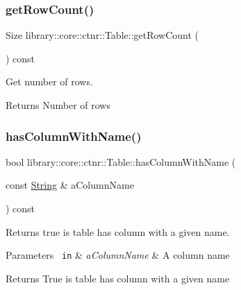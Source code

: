 \subsubsection{\texorpdfstring{getRowCount()}{getRowCount()}}
{\footnotesize\ttfamily Size library\+::core\+::ctnr\+::\+Table\+::get\+Row\+Count (\begin{DoxyParamCaption}{ }\end{DoxyParamCaption}) const}



Get number of rows. 


\begin{DoxyCode}{0}
\end{DoxyCode}


\begin{DoxyReturn}{Returns}
Number of rows 
\end{DoxyReturn}
\mbox{\label{classlibrary_1_1core_1_1ctnr_1_1_table_a53d1981ce11ba15cc920addfba23e236}} 
\subsubsection{\texorpdfstring{hasColumnWithName()}{hasColumnWithName()}}
{\footnotesize\ttfamily bool library\+::core\+::ctnr\+::\+Table\+::has\+Column\+With\+Name (\begin{DoxyParamCaption}\item[{const \mbox{\hyperlink{classlibrary_1_1core_1_1types_1_1_string}{String}} \&}]{a\+Column\+Name }\end{DoxyParamCaption}) const}



Returns true is table has column with a given name. 


\begin{DoxyParams}[1]{Parameters}
\mbox{\texttt{ in}}  & {\em a\+Column\+Name} & A column name \\
\hline
\end{DoxyParams}
\begin{DoxyReturn}{Returns}
True is table has column with a given name 
\end{DoxyReturn}
\mbox{\label{classlibrary_1_1core_1_1ctnr_1_1_table_ae0b9f9ee022ed72e06ed41f324855c1a}} 
